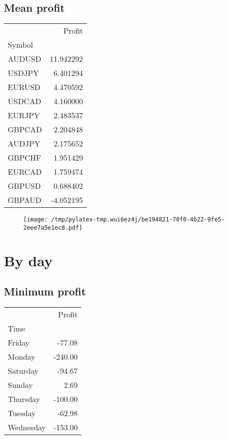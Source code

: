 \documentclass{article}%
\begin{document}
%
\newpage %
\subsection{Mean profit }%
\label{subsec:Meanprofit}%
\begin{tabular}{lr}
\toprule
{} &     Profit \\
Symbol &            \\
\midrule
AUDUSD &  11.942292 \\
USDJPY &   6.401294 \\
EURUSD &   4.470592 \\
USDCAD &   4.160000 \\
EURJPY &   2.483537 \\
GBPCAD &   2.204848 \\
AUDJPY &   2.175652 \\
GBPCHF &   1.951429 \\
EURCAD &   1.759474 \\
GBPUSD &   0.688402 \\
GBPAUD &  -4.052195 \\
\bottomrule
\end{tabular}
%


\begin{figure}[htbp]%
\centering%
\texttt{[image: /tmp/pylatex-tmp.wui6ez4j/be194821-70f0-4b22-9fe5-2eee7a5e1ec8.pdf]}%
\end{figure}

%
\newpage %
\section{By day}%
\label{sec:Byday}%
\subsection{Minimum profit }%
\label{subsec:Minimumprofit}%
\begin{tabular}{lr}
\toprule
{} &  Profit \\
Time      &         \\
\midrule
Friday    &  -77.08 \\
Monday    & -240.00 \\
Saturday  &  -94.67 \\
Sunday    &    2.69 \\
Thursday  & -100.00 \\
Tuesday   &  -62.98 \\
Wednesday & -153.00 \\
\bottomrule
\end{tabular}
%
\end{document}
